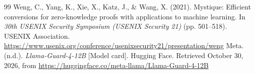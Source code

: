 \documentclass[11pt]{article}
\begin{document}
\begin{thebibliography}{99}
 Weng, C., Yang, K., Xie, X., Katz, J., \& Wang, X. (2021). Mystique: Efficient conversions for zero-knowledge proofs with applications to machine learning. In \emph{30th USENIX Security Symposium (USENIX Security 21)} (pp. 501--518). USENIX Association. \url{https://www.usenix.org/conference/usenixsecurity21/presentation/weng}
 Meta. (n.d.). \emph{Llama-Guard-4-12B} [Model card]. Hugging Face. Retrieved October 30, 2026, from \url{https://huggingface.co/meta-llama/Llama-Guard-4-12B}
\end{thebibliography}
\end{document}
